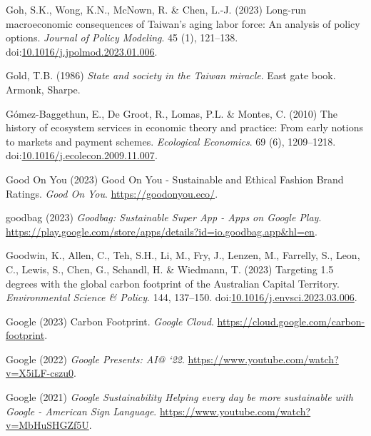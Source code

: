 \documentclass[
  letterpaper,
  DIV=11,
  numbers=noendperiod]{scrartcl}
\newlength{\cslhangindent}
\newenvironment{CSLReferences}[2] %
 {\begin{list}{}{%
  \setlength{\itemindent}{0pt}
  \setlength{\leftmargin}{0pt}
  \setlength{\parsep}{0pt}
  \ifodd #1
   \setlength{\leftmargin}{\cslhangindent}
   \setlength{\itemindent}{-1\cslhangindent}
  \fi
  \setlength{\itemsep}{#2\baselineskip}}}
 {\end{list}}
\begin{document}
\begin{CSLReferences}{0}{1}
Goh, S.K., Wong, K.N., McNown, R. \& Chen, L.-J. (2023) Long-run
macroeconomic consequences of {Taiwan}'s aging labor force: An analysis
of policy options. \emph{Journal of Policy Modeling}. 45 (1), 121--138.
doi:\href{https://doi.org/10.1016/j.jpolmod.2023.01.006}{10.1016/j.jpolmod.2023.01.006}.

Gold, T.B. (1986) \emph{State and society in the {Taiwan} miracle}. East
gate book. Armonk, Sharpe.

Gómez-Baggethun, E., De Groot, R., Lomas, P.L. \& Montes, C. (2010) The
history of ecosystem services in economic theory and practice: {From}
early notions to markets and payment schemes. \emph{Ecological
Economics}. 69 (6), 1209--1218.
doi:\href{https://doi.org/10.1016/j.ecolecon.2009.11.007}{10.1016/j.ecolecon.2009.11.007}.

Good On You (2023) Good {On You} - {Sustainable} and {Ethical Fashion
Brand Ratings}. \emph{Good On You}. \url{https://goodonyou.eco/}.

goodbag (2023) \emph{Goodbag: {Sustainable Super App} - {Apps} on
{Google Play}}.
\url{https://play.google.com/store/apps/details?id=io.goodbag.app&hl=en}.

Goodwin, K., Allen, C., Teh, S.H., Li, M., Fry, J., Lenzen, M.,
Farrelly, S., Leon, C., Lewis, S., Chen, G., Schandl, H. \& Wiedmann, T.
(2023) Targeting 1.5 degrees with the global carbon footprint of the
{Australian Capital Territory}. \emph{Environmental Science \& Policy}.
144, 137--150.
doi:\href{https://doi.org/10.1016/j.envsci.2023.03.006}{10.1016/j.envsci.2023.03.006}.

Google (2023) Carbon {Footprint}. \emph{Google Cloud}.
\url{https://cloud.google.com/carbon-footprint}.

Google (2022) \emph{Google {Presents}: {AI}@ `22}.
\url{https://www.youtube.com/watch?v=X5iLF-cszu0}.

Google (2021) \emph{Google {Sustainability} {\textbar} {Helping} every
day be more sustainable with {Google} - {American Sign Language}}.
\url{https://www.youtube.com/watch?v=MbHuSHGZf5U}.


\end{CSLReferences}
\end{document}
